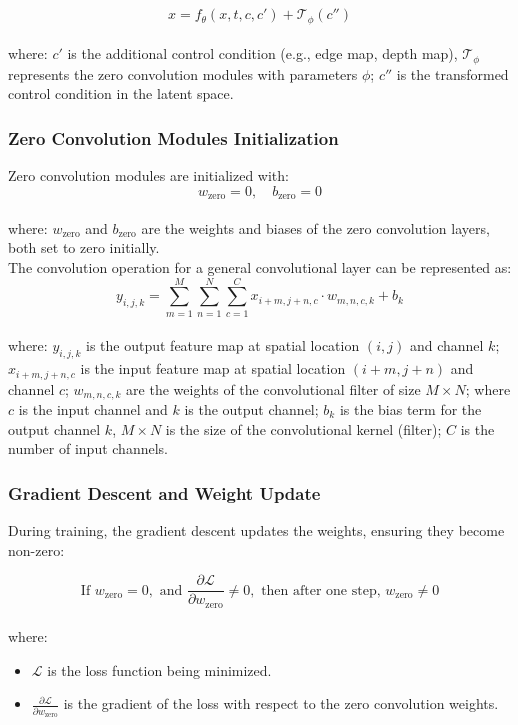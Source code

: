 \documentclass[12pt]{article}
\begin{document}
\[
\hat{x} = f_\theta(x, t, c, c') + \mathcal{T}_\phi(c'')
\]
\\
where: $c'$ is the additional control condition (e.g., edge map, depth map), $\mathcal{T}_\phi$ represents the zero convolution modules with parameters $\phi$; $c''$ is the transformed control condition in the latent space.

\subsubsection*{Zero Convolution Modules Initialization}

Zero convolution modules are initialized with:
\[ w_{\text{zero}} = 0, \quad b_{\text{zero}} = 0 \]
\\
where: $w_{\text{zero}}$ and $b_{\text{zero}}$ are the weights and biases of the zero convolution layers, both set to zero initially.
\\
The convolution operation for a general convolutional layer can be represented as:
\[
y_{i, j, k} = \sum_{m=1}^{M} \sum_{n=1}^{N} \sum_{c=1}^{C} x_{i+m, j+n, c} \cdot w_{m, n, c, k} + b_k
\]
\\
where: $y_{i, j, k}$ is the output feature map at spatial location $(i, j)$ and channel $k$; $x_{i+m, j+n, c}$ is the input feature map at spatial location $(i+m, j+n)$ and channel $c$; $w_{m, n, c, k}$ are the weights of the convolutional filter of size $M \times N$; where $c$ is the input channel and $k$ is the output channel; $b_k$ is the bias term for the output channel $k$, $M \times N$ is the size of the convolutional kernel (filter); $C$ is the number of input channels.

\subsubsection*{Gradient Descent and Weight Update}

During training, the gradient descent updates the weights, ensuring they become non-zero:

\[
\text{If } w_{\text{zero}} = 0, \text{ and } \frac{\partial \mathcal{L}}{\partial w_{\text{zero}}} \neq 0, \text{ then after one step, } w_{\text{zero}} \neq 0
\]
\\
where:
\begin{itemize}
    \item $\mathcal{L}$ is the loss function being minimized.
    \item $\frac{\partial \mathcal{L}}{\partial w_{\text{zero}}}$ is the gradient of the loss with respect to the zero convolution weights.
\end{itemize}
\end{document}
